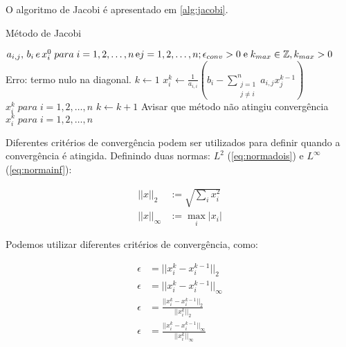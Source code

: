 \documentclass[final,5p]{elsarticle}
\numberwithin{equation}{section}
\begin{document}
        O algoritmo de Jacobi é apresentado em \ref{alg:jacobi}.

        \begin{algorithm}
            \caption{Método de Jacobi}\label{alg:jacobi}
            \begin{algorithmic}
                \Require $a_{i,j},\,b_i\,e\, x_i^0\; para \; i=1,2,\ldots,n\,\text{e}\\j=1,2,\ldots,n;\\\epsilon_{conv} > 0\;\text{e}\; k_{max} \in \mathbb{Z}, k_{max} > 0$
                        \State \Return Erro: termo nulo na diagonal.
                    \EndIf
                \EndFor
                \State $k \gets 1$
                        \State $x_i^k \gets \frac{1}{a_{i,i}} ( b_i - \sum^{n}_{\substack{j=1 \\ j \neq i}} a_{i,j} x_j^{k-1} )$
                    \EndFor
                        \State \Return $x_i^k \; para \; i=1,2,\ldots,n$
                    \EndIf
                    \State $k \gets k+1$
                \EndWhile
                \State Avisar que método não atingiu convergência
                \State \Return $x_i^k \; para \; i=1,2,\ldots,n$
            \end{algorithmic}
        \end{algorithm}

        Diferentes critérios de convergência podem ser utilizados para definir quando a convergência é atingida. Definindo duas normas: $L^2$ (\ref{eq:normadois}) e $L^\infty$ (\ref{eq:normainf}):

        \begin{align}
            ||x||_2 &:= \sqrt{\sum_{i}x_i^2} \label{eq:normadois} \\
            ||x||_\infty &:= \max_{i} |x_i| \label{eq:normainf}
        \end{align}

        Podemos utilizar diferentes critérios de convergência, como:

        \begin{align}
            \epsilon &= ||x_i^k - x_i^{k-1}||_2 \label{eq:conva} \\
            \epsilon &= ||x_i^k - x_i^{k-1}||_\infty \label{eq:convb} \\
            \epsilon &= \frac{||x_i^k - x_i^{k-1}||_2}{||x_i^k||_2} \label{eq:convc} \\
            \epsilon &= \frac{||x_i^k - x_i^{k-1}||_\infty}{||x_i^k||_\infty} \label{eq:convd} \\
        \end{align}
\end{document}
